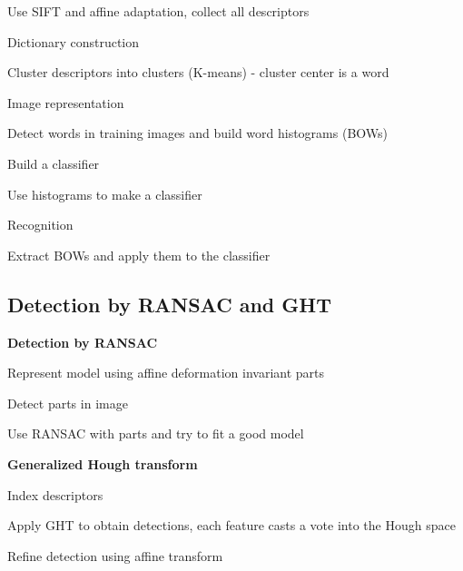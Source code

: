 \documentclass{article}
\begin{document}
\begin{multicols*}{2}
{\begin{compactenum}
	Use SIFT and affine adaptation, collect all descriptors
	
	\item Dictionary construction
	
	Cluster descriptors into clusters (K-means) - cluster center is a word
	
	\item Image representation
	
	Detect words in training images and build word histograms (BOWs)
	
	\item Build a classifier
	
	Use histograms to make a classifier
	
	\item Recognition
	
	Extract BOWs and apply them to the classifier
\end{compactenum}

\subsection{Detection by RANSAC and GHT}

\textbf{Detection by RANSAC}
\begin{compactenum}
	\item Represent model using affine deformation invariant parts
	\item Detect parts in image
	\item Use RANSAC with parts and try to fit a good model
\end{compactenum}

\textbf{Generalized Hough transform}
\begin{compactenum}
	\item Index descriptors
	\item Apply GHT to obtain detections, each feature casts a vote into the Hough space
	\item Refine detection using affine transform
\end{compactenum}

}
\end{multicols*}
\end{document}

